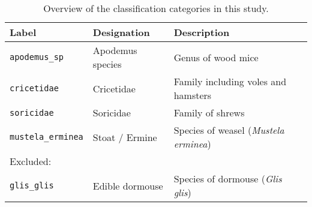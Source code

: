 \begin{table}[ht]
\centering
\caption{Overview of the classification categories in this study.}
\label{tab:class_labels}
\begin{tabular}{lll}
\toprule
\textbf{Label} & \textbf{Designation} & \textbf{Description} \\
\midrule
\texttt{apodemus\_sp}     & Apodemus species        & Genus of wood mice \\
\texttt{cricetidae}       & Cricetidae              & Family including voles and hamsters \\
\texttt{soricidae}        & Soricidae               & Family of shrews \\
\texttt{mustela\_erminea} & Stoat / Ermine          & Species of weasel (\textit{Mustela erminea}) \\
\midrule
\multicolumn{3}{l}{Excluded:} \\
\texttt{glis\_glis}       & Edible dormouse         & Species of dormouse (\textit{Glis glis}) \\
\bottomrule
\end{tabular}
\end{table}